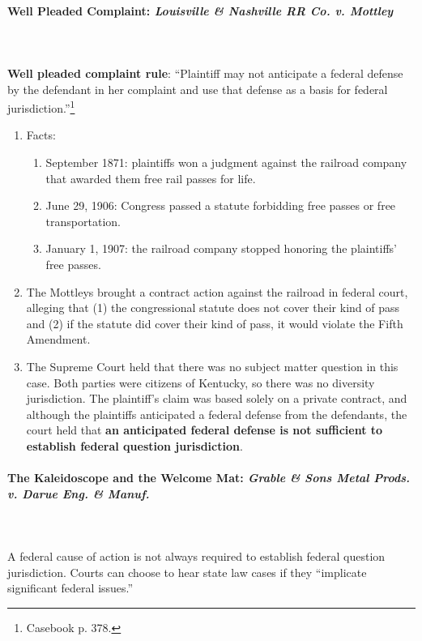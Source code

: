 \paragraph{Well Pleaded Complaint: \emph{Louisville \& Nashville RR Co. v.  
Mottley}}
~\\\\
\textbf{Well pleaded complaint rule}: ``Plaintiff may not anticipate a federal 
defense by the defendant in her complaint and use that defense as a basis for 
federal jurisdiction.''\footnote{Casebook p. 378.}

\begin{enumerate}
    \item Facts:
    \begin{enumerate}
        \item September 1871: plaintiffs won a judgment against the railroad 
        company that awarded them free rail passes for life.
        \item June 29, 1906: Congress passed a statute forbidding free passes 
        or free transportation.
        \item January 1, 1907: the railroad company stopped honoring the 
        plaintiffs' free passes.
    \end{enumerate}
    \item The Mottleys brought a contract action against the railroad in 
    federal court, alleging that (1) the congressional statute does not cover 
    their kind of pass and (2) if the statute did cover their kind of pass, it 
    would violate the Fifth Amendment.
    \item The Supreme Court held that there was no subject matter question in 
    this case. Both parties were citizens of Kentucky, so there was no 
    diversity jurisdiction. The plaintiff's claim was based solely on a 
    private contract, and although the plaintiffs anticipated a federal 
    defense from the defendants, the court held that \textbf{an anticipated 
    federal defense is not sufficient to establish federal question 
    jurisdiction}.
\end{enumerate}

\paragraph{The Kaleidoscope and the Welcome Mat: \emph{Grable \& Sons Metal 
Prods. v. Darue Eng. \& Manuf.}}
~\\\\
A federal cause of action is not always required to establish federal question 
jurisdiction. Courts can choose to hear state law cases if they ``implicate 
significant federal issues.''

